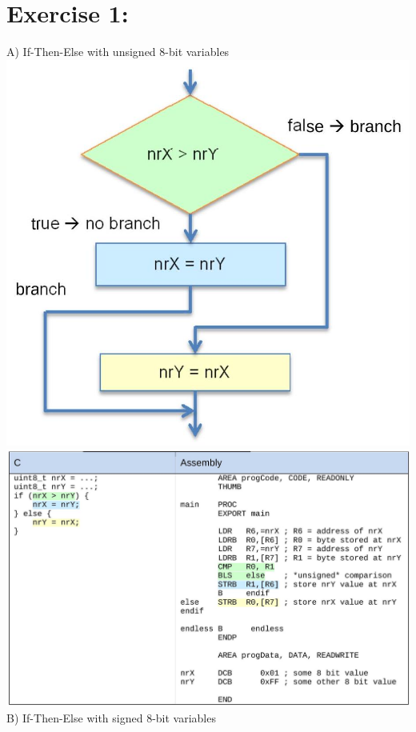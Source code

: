 \documentclass[10pt]{article}
\begin{document}
\section*{Exercise 1:}
A) If-Then-Else with unsigned 8-bit variables\\
\includegraphics[max width=\textwidth, center]{2025_01_02_7eee2d56b23c0199f878g-5}\\
\includegraphics[max width=\textwidth, center]{2025_01_02_7eee2d56b23c0199f878g-5(1)}\\
B) If-Then-Else with signed 8-bit variables\\
\end{document}
